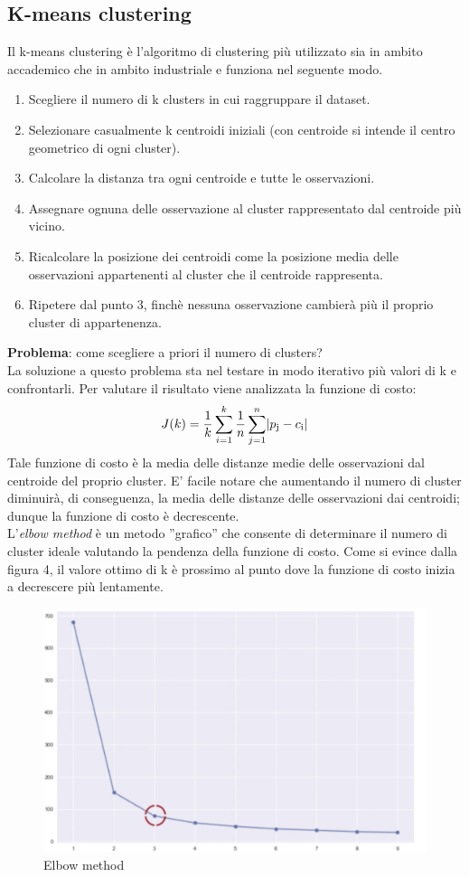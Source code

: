 \documentclass[10pt,a4paper]{report}
\DeclarePairedDelimiter\abs{\lvert}{\rvert}
\begin{document}
        		\subsection{K-means clustering}
        		Il k-means clustering è l'algoritmo di clustering più utilizzato sia in ambito accademico che in ambito industriale e funziona nel seguente modo.
        		\begin{enumerate}
        		\item Scegliere il numero di k clusters in cui raggruppare il dataset.
        		\item Selezionare casualmente k centroidi iniziali (con centroide si intende il centro geometrico di ogni cluster).
        		\item Calcolare la distanza tra ogni centroide e tutte le osservazioni.
        		\item Assegnare ognuna delle osservazione al cluster rappresentato dal centroide più vicino.
        		\item Ricalcolare la posizione dei centroidi come la posizione media delle osservazioni appartenenti al cluster che il centroide rappresenta.
        		\item Ripetere dal punto 3, finchè nessuna osservazione cambierà più il proprio cluster di appartenenza.
        		\end{enumerate}
		\textbf{Problema}: come scegliere a priori il numero di clusters?\\
		La soluzione a questo problema sta nel testare in modo iterativo più valori di k e confrontarli. 
		Per valutare il risultato viene analizzata la funzione di costo:
		\[
		J(k)=\frac{1}{k}
		\sum_{i=1}^k
		\frac{1}{n}
		\sum_{j=1}^n
		\abs{p\textsubscript{j}-c\textsubscript{i}}
		\]
		Tale funzione di costo è la media delle distanze medie delle osservazioni dal centroide del proprio cluster. E' facile notare che aumentando il numero di
		cluster diminuirà, di conseguenza, la media delle distanze delle osservazioni dai centroidi; dunque la funzione di costo è decrescente.\\
		L'\textit{elbow method} è un metodo ''grafico'' che consente di determinare il numero di cluster ideale valutando la pendenza della funzione di costo.
		Come si evince dalla figura 4, il valore ottimo di k è prossimo al punto dove la funzione di costo inizia a decrescere più lentamente.
		\begin{figure}[H]
		\centering
		\includegraphics[scale=0.5]{elbow_method.png}
		\caption{Elbow method}
		\end{figure}
\end{document}
